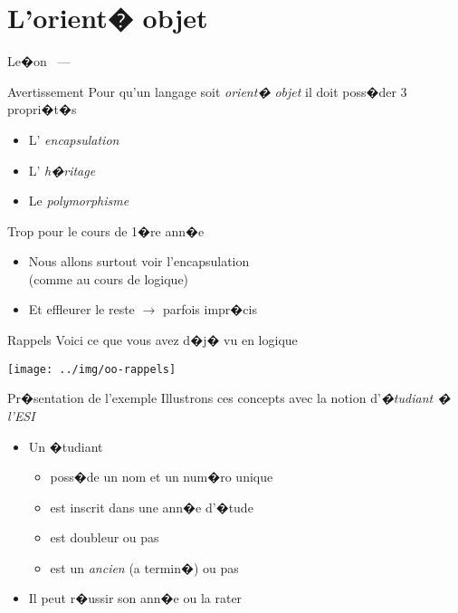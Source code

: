 
\section{L'orient� objet}

\begin{frame}
\begin{block}{\center Le�on \thesection\ ---   \insertsection}
  {
  \begin{multicols}{2}
  \tableofcontents[sectionstyle=hide,subsectionstyle=show/show/hide]
  \end{multicols}
  \bigskip
  }
\end{block}
\end{frame}

\begin{frame}{Avertissement}
Pour qu'un langage soit \textit{orient� objet} il doit poss�der 3 propri�t�s
  \begin{itemize}
  \item L' \emph{encapsulation}
  \item L' \emph{h�ritage}
  \item Le \emph{polymorphisme}
  \end{itemize} 
\bigskip
Trop pour le cours de 1�re ann�e
  \begin{itemize}
  \item Nous allons surtout voir l'encapsulation \\(comme au cours de logique)
  \item Et effleurer le reste $\longrightarrow$ parfois impr�cis
  \end{itemize}
\end{frame}

\begin{frame}{Rappels}
Voici ce que vous avez d�j� vu en logique
\begin{center}
\texttt{[image: ../img/oo-rappels]}
\end{center}
\end{frame}

\begin{frame}{Pr�sentation de l'exemple}
Illustrons ces concepts avec la notion d'\textit{�tudiant � l'ESI}
\begin{itemize}
 \item Un �tudiant
    \begin{itemize}
    \item poss�de un nom et un num�ro unique
    \item est inscrit dans une ann�e d'�tude
    \item est doubleur ou pas
    \item est un \textit{ancien} (a termin�) ou pas
    \end{itemize}
  \item Il peut r�ussir son ann�e ou la rater
  \end{itemize}
\end{frame}

